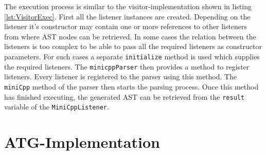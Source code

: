 The execution process is similar to the visitor-implementation shown in listing \ref{lst:VisitorExec}. First all the listener instances are created. Depending on the listener it's constructor may contain one or more references to other listeners from where AST nodes can be retrieved. In some cases the relation between the listeners is too complex to be able to pass all the required listeners as constructor parameters. For such cases a separate \verb|initialize| method is used which supplies the required listeners. The \verb|minicppParser| then provides a method to register listeners. Every listener is registered to the parser using this method. The \verb|miniCpp| method of the parser then starts the parsing process. Once this method has finished executing, the generated AST can be retrieved from the \verb|result| variable of the \verb|MiniCppListener|.

\section{ATG-Implementation}

